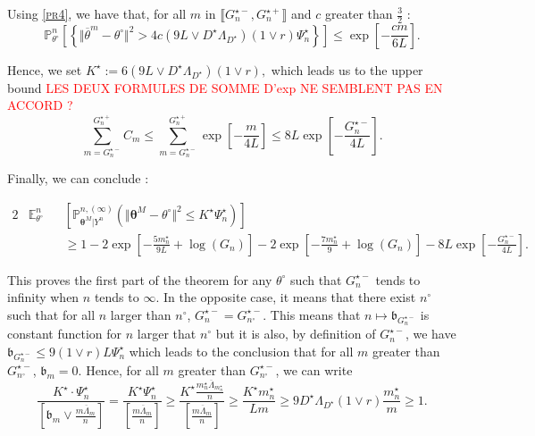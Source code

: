 Using \textsc{\cref{pr4}}, we have that, for all $m$ in $\llbracket G_{n}^{\star-}, G_{n}^{\star+} \rrbracket$ and $c$ greater than $\frac{3}{2}$ :
\[\mathds{P}_{\theta^{\circ}}^{n}\left[\left\{\Vert \overline{\theta}^{m} - \theta^{\circ}\Vert^{2} > 4c \left(9 L \vee D^{\star} \Lambda_{D^{\star}}\right) \left(1 \vee r\right) \Psi_{n}^{\star}\right\}\right] \leq \exp\left[-\frac{c m}{6 L}\right].\]

Hence, we set $K^{\star} := 6 \left(9L \vee D^{\star} \Lambda_{D^{\star}}\right) \left(1 \vee r\right),$ which leads us to the upper bound \textcolor{red}{LES DEUX FORMULES DE SOMME D'exp NE SEMBLENT PAS EN ACCORD ?}
\[\sum\limits_{m = G_{n}^{\star-}}^{G_{n}^{\star+}}C_{m} \leq \sum\limits_{m = G_{n}^{\star-}}^{G_{n}^{\star+}} \exp\left[- \frac{m}{4 L}\right] \leq 8L \exp\left[-\frac{G_{n}^{\star-}}{4 L}\right].\]

\bigskip

Finally, we can conclude :

\begin{alignat*}{2}
& \mathds{E}_{\theta^{\circ}}^{n} && \left[\mathds{P}_{\boldsymbol{\theta}^{M}\vert Y^{n}}^{n, (\infty)}\left(\Vert \boldsymbol{\theta}^{M} - \theta^{\circ} \Vert ^{2} \leq K^{\star} \Psi_{n}^{\star}\right)\right]\\
& && \geq 1 - 2 \exp\left[- \frac{5 m_{n}^{\star}}{9 L} + \log\left(G_{n}\right)\right] - 2 \exp\left[- \frac{7 m_{n}^{\star}}{9} + \log\left(G_{n}\right)\right] - 8 L \exp\left[- \frac{G_{n}^{\star-}}{4L}\right].
\end{alignat*}

This proves the first part of the theorem for any $\theta^{\circ}$ such that $G_{n}^{\star-}$ tends to infinity when $n$ tends to $\infty$.
In the opposite case, it means that there exist $n^{\circ}$ such that for all $n$ larger than $n^{\circ}$, $G_{n}^{\star-} = G_{n^{\circ}}^{\star-}.$
This means that $n \mapsto \mathfrak{b}_{G_{n}^{\star-}}$ is constant function for $n$ larger that $n^{\circ}$ but it is also, by definition of $G_{n}^{\star-}$, we have $\mathfrak{b}_{G_{n}^{\star-}} \leq 9 \left(1 \vee r\right) L \Psi_{n}^{\star}$ which leads to the conclusion that for all $m$ greater than $G_{n^{\circ}}^{\star-}$, $\mathfrak{b}_{m} = 0.$
Hence, for all $m$ greater than $G_{n^{\circ}}^{\star-}$, we can write
\[\frac{K^{\star} \cdot \Psi_{n}^{\star}}{\left[\mathfrak{b}_{m} \vee \frac{m \overline{\Lambda}_{m}}{n} \right]} = \frac{ K^{\star} \Psi_{n}^{\star}}{\left[\frac{m \overline{\Lambda}_{m}}{n} \right]} \geq \frac{K^{\star} \frac{m_{n}^{\star} \overline{\Lambda}_{m_{n}^{\star}}}{n}}{\left[\frac{m \overline{\Lambda}_{m}}{n} \right]} \geq \frac{K^{\star} m_{n}^{\star}}{L m} \geq 9 D^{\star} \Lambda_{D^{\star}} \left(1 \vee r\right) \frac{m_{n}^{\star}}{m} \geq 1.\]

